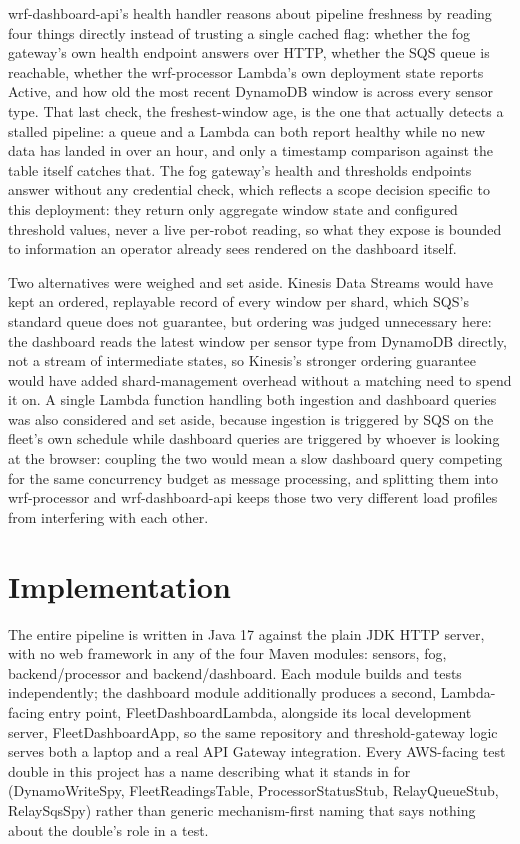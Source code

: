 \documentclass[conference]{IEEEtran}
\begin{document}
wrf-dashboard-api's health handler reasons about pipeline freshness by reading four things directly instead of trusting a single cached flag: whether the fog gateway's own health endpoint answers over HTTP, whether the SQS queue is reachable, whether the wrf-processor Lambda's own deployment state reports Active, and how old the most recent DynamoDB window is across every sensor type. That last check, the freshest-window age, is the one that actually detects a stalled pipeline: a queue and a Lambda can both report healthy while no new data has landed in over an hour, and only a timestamp comparison against the table itself catches that. The fog gateway's health and thresholds endpoints answer without any credential check, which reflects a scope decision specific to this deployment: they return only aggregate window state and configured threshold values, never a live per-robot reading, so what they expose is bounded to information an operator already sees rendered on the dashboard itself.

Two alternatives were weighed and set aside. Kinesis Data Streams would have kept an ordered, replayable record of every window per shard, which SQS's standard queue does not guarantee, but ordering was judged unnecessary here: the dashboard reads the latest window per sensor type from DynamoDB directly, not a stream of intermediate states, so Kinesis's stronger ordering guarantee would have added shard-management overhead without a matching need to spend it on. A single Lambda function handling both ingestion and dashboard queries was also considered and set aside, because ingestion is triggered by SQS on the fleet's own schedule while dashboard queries are triggered by whoever is looking at the browser: coupling the two would mean a slow dashboard query competing for the same concurrency budget as message processing, and splitting them into wrf-processor and wrf-dashboard-api keeps those two very different load profiles from interfering with each other.

\section{Implementation}

The entire pipeline is written in Java 17 against the plain JDK HTTP server, with no web framework in any of the four Maven modules: sensors, fog, backend/processor and backend/dashboard. Each module builds and tests independently; the dashboard module additionally produces a second, Lambda-facing entry point, FleetDashboardLambda, alongside its local development server, FleetDashboardApp, so the same repository and threshold-gateway logic serves both a laptop and a real API Gateway integration. Every AWS-facing test double in this project has a name describing what it stands in for (DynamoWriteSpy, FleetReadingsTable, ProcessorStatusStub, RelayQueueStub, RelaySqsSpy) rather than generic mechanism-first naming that says nothing about the double's role in a test.
\end{document}
